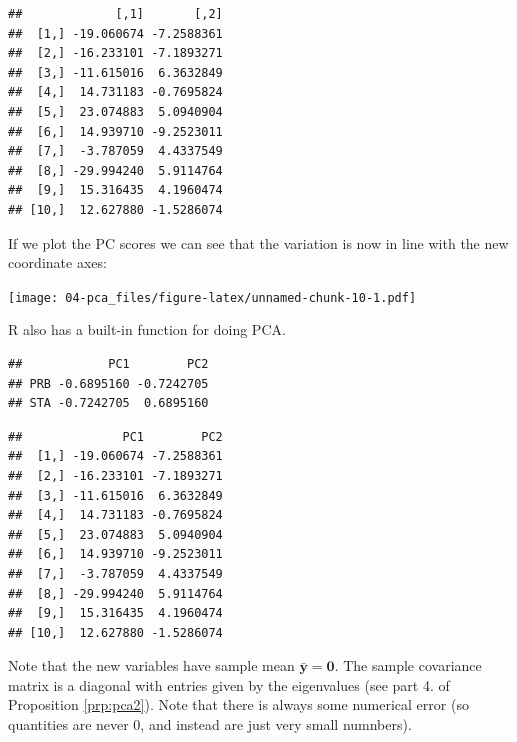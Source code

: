\documentclass[
]{book}
\newenvironment{Shaded}{\begin{snugshade}}{\end{snugshade}}
\newcommand{\CommentTok}[1]{\textcolor[rgb]{0.56,0.35,0.01}{\textit{#1}}}
\newcommand{\DecValTok}[1]{\textcolor[rgb]{0.00,0.00,0.81}{#1}}
\newcommand{\FunctionTok}[1]{\textcolor[rgb]{0.00,0.00,0.00}{#1}}
\newcommand{\NormalTok}[1]{#1}
\newcommand{\OtherTok}[1]{\textcolor[rgb]{0.56,0.35,0.01}{#1}}
\newcommand{\SpecialCharTok}[1]{\textcolor[rgb]{0.00,0.00,0.00}{#1}}
\theoremstyle{definition}
\theoremstyle{definition}
\theoremstyle{definition}
\theoremstyle{definition}
\theoremstyle{remark}
\begin{document}
\begin{verbatim}
##             [,1]       [,2]
##  [1,] -19.060674 -7.2588361
##  [2,] -16.233101 -7.1893271
##  [3,] -11.615016  6.3632849
##  [4,]  14.731183 -0.7695824
##  [5,]  23.074883  5.0940904
##  [6,]  14.939710 -9.2523011
##  [7,]  -3.787059  4.4337549
##  [8,] -29.994240  5.9114764
##  [9,]  15.316435  4.1960474
## [10,]  12.627880 -1.5286074
\end{verbatim}

If we plot the PC scores we can see that the variation is now in line with the new coordinate axes:

\texttt{[image: 04-pca\_files/figure-latex/unnamed-chunk-10-1.pdf]}

R also has a built-in function for doing PCA.

\begin{Shaded}
\end{Shaded}

\begin{verbatim}
##            PC1        PC2
## PRB -0.6895160 -0.7242705
## STA -0.7242705  0.6895160
\end{verbatim}

\begin{Shaded}
\end{Shaded}

\begin{verbatim}
##              PC1        PC2
##  [1,] -19.060674 -7.2588361
##  [2,] -16.233101 -7.1893271
##  [3,] -11.615016  6.3632849
##  [4,]  14.731183 -0.7695824
##  [5,]  23.074883  5.0940904
##  [6,]  14.939710 -9.2523011
##  [7,]  -3.787059  4.4337549
##  [8,] -29.994240  5.9114764
##  [9,]  15.316435  4.1960474
## [10,]  12.627880 -1.5286074
\end{verbatim}

Note that the new variables have sample mean \(\bar{\mathbf y}=\boldsymbol 0\). The sample covariance matrix is a diagonal with entries given by the eigenvalues (see part 4. of Proposition \ref{prp:pca2}). Note that there is always some numerical error (so quantities are never 0, and instead are just very small numnbers).
\end{document}
